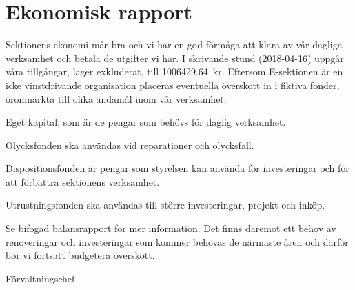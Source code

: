 \documentclass[../_main/handlingar.tex]{subfiles}
\begin{document}
\section{Ekonomisk rapport}

Sektionens ekonomi mår bra och vi har en god förmåga att klara av vår dagliga verksamhet och betala de utgifter vi har. I skrivande stund (2018-04-16) uppgår våra tillgångar, lager exkluderat, till \SI{1 006 429,64}{kr}. Eftersom E-sektionen är en icke vinstdrivande organisation placeras eventuella överskott in i fiktiva fonder, öronmärkta till olika ändamål inom vår verksamhet. 

\begin{dashlist}
\item Eget kapital, som är de pengar som behövs för daglig verksamhet.
\item Olycksfonden ska användas vid reparationer och olycksfall.
\item Dispositionsfonden är pengar som styrelsen kan använda för investeringar och för att förbättra sektionens verksamhet.
\item Utrustningsfonden ska användas till större investeringar, projekt och inköp.
\end{dashlist}

Se bifogad balansrapport för mer information.
Det finns däremot ett behov av renoveringar och investeringar som kommer behövas de närmaste åren och därför bör vi fortsatt budgetera överskott.

\begin{signatures}{1}
    \mvh
    \signature{\fvc}{Förvaltningschef}
\end{signatures}
\end{document}

